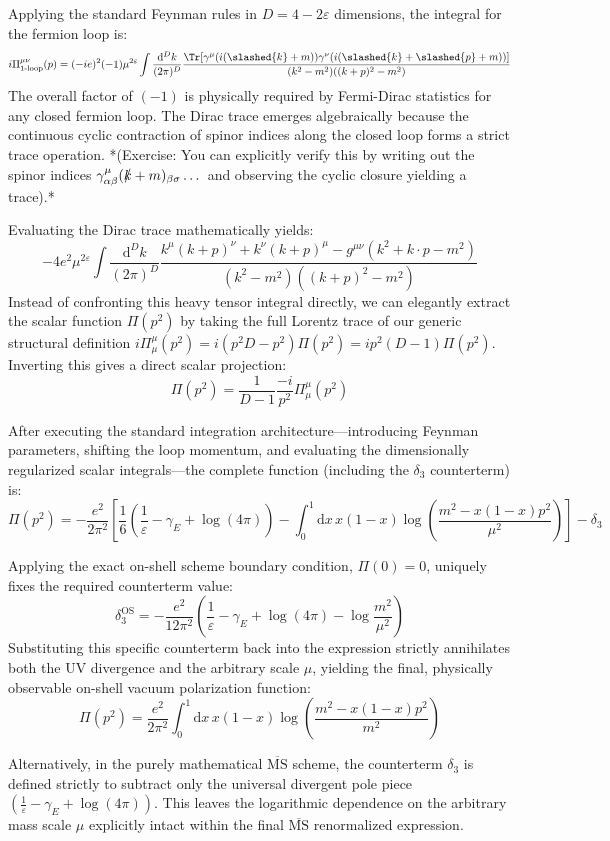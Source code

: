 Applying the standard Feynman rules in $D=4-2\varepsilon$ dimensions, the integral for the fermion loop is:
\[
    i\Pi^{\mu\nu}_{1\text{-loop}}(p) = (-ie)^2 (-1) \mu^{2\varepsilon} \int \frac{\mathrm{d}^D k}{(2\pi)^D} \frac{\Tr[\gamma^\mu (i(\slashed{k}+m)) \gamma^\nu (i(\slashed{k}+\slashed{p}+m))]}{(k^2-m^2)((k+p)^2-m^2)}
\]
The overall factor of $(-1)$ is physically required by Fermi-Dirac statistics for any closed fermion loop. The Dirac trace emerges algebraically because the continuous cyclic contraction of spinor indices along the closed loop forms a strict trace operation. *(Exercise: You can explicitly verify this by writing out the spinor indices $\gamma^\mu_{\alpha\beta} (\slashed{k}+m)_{\beta\sigma} \dots$ and observing the cyclic closure yielding a trace).*

Evaluating the Dirac trace mathematically yields:
\[
    -4e^2 \mu^{2\varepsilon} \int \frac{\mathrm{d}^D k}{(2\pi)^D} \frac{k^\mu(k+p)^\nu + k^\nu(k+p)^\mu - g^{\mu\nu}(k^2 + k\cdot p - m^2)}{(k^2-m^2)((k+p)^2-m^2)}
\]
Instead of confronting this heavy tensor integral directly, we can elegantly extract the scalar function $\Pi(p^2)$ by taking the full Lorentz trace of our generic structural definition $i\Pi^\mu_\mu(p^2) = i(p^2 D - p^2)\Pi(p^2) = i p^2 (D-1) \Pi(p^2)$. Inverting this gives a direct scalar projection:
\[
    \Pi(p^2) = \frac{1}{D-1}\frac{-i}{p^2} \Pi^\mu_\mu(p^2)
\]

After executing the standard integration architecture—introducing Feynman parameters, shifting the loop momentum, and evaluating the dimensionally regularized scalar integrals—the complete function (including the $\delta_3$ counterterm) is:
\[
    \Pi(p^2) = -\frac{e^2}{2\pi^2} \left[ \frac{1}{6}\left(\frac{1}{\varepsilon} - \gamma_E + \log(4\pi)\right) - \int_0^1 \mathrm{d}x \, x(1-x) \log\left(\frac{m^2 - x(1-x)p^2}{\mu^2}\right) \right] - \delta_3
\]

Applying the exact on-shell scheme boundary condition, $\Pi(0) = 0$, uniquely fixes the required counterterm value:
\[
    \delta_3^{\text{OS}} = -\frac{e^2}{12\pi^2} \left( \frac{1}{\varepsilon} - \gamma_E + \log(4\pi) - \log\frac{m^2}{\mu^2} \right)
\]
Substituting this specific counterterm back into the expression strictly annihilates both the UV divergence and the arbitrary scale $\mu$, yielding the final, physically observable on-shell vacuum polarization function:
\[
    \Pi(p^2) = \frac{e^2}{2\pi^2} \int_0^1 \mathrm{d}x \, x(1-x) \log\left( \frac{m^2 - x(1-x)p^2}{m^2} \right)
\]

Alternatively, in the purely mathematical $\overline{\text{MS}}$ scheme, the counterterm $\delta_3$ is defined strictly to subtract only the universal divergent pole piece $(\frac{1}{\varepsilon} - \gamma_E + \log(4\pi))$. This leaves the logarithmic dependence on the arbitrary mass scale $\mu$ explicitly intact within the final $\overline{\text{MS}}$ renormalized expression.

